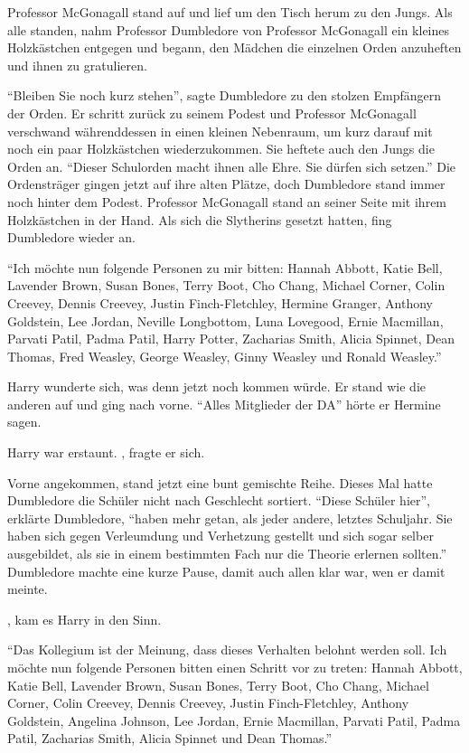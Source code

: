 Professor McGonagall stand auf und lief um den Tisch herum zu den Jungs. Als alle standen, nahm Professor Dumbledore von Professor McGonagall ein kleines Holzkästchen entgegen und begann, den Mädchen die einzelnen Orden anzuheften und ihnen zu gratulieren.

\enquote{Bleiben Sie noch kurz stehen}, sagte Dumbledore zu den stolzen Empfängern der Orden. Er schritt zurück zu seinem Podest und Professor McGonagall verschwand währenddessen in einen kleinen Nebenraum, um kurz darauf mit noch ein paar Holzkästchen wiederzukommen. Sie heftete auch den Jungs die Orden an. \enquote{Dieser Schulorden macht ihnen alle Ehre. Sie dürfen sich setzen.} Die Ordensträger gingen jetzt auf ihre alten Plätze, doch Dumbledore stand immer noch hinter dem Podest. Professor McGonagall stand an seiner Seite mit ihrem Holzkästchen in der Hand. Als sich die Slytherins gesetzt hatten, fing Dumbledore wieder an.

\enquote{Ich möchte nun folgende Personen zu mir bitten: Hannah Abbott, Katie Bell, Lavender Brown, Susan Bones, Terry Boot, Cho Chang, Michael Corner, Colin Creevey, Dennis Creevey, Justin Finch-Fletchley, Hermine Granger, Anthony Goldstein, Lee Jordan, Neville Longbottom, Luna Lovegood, Ernie Macmillan, Parvati Patil, Padma Patil, Harry Potter, Zacharias Smith, Alicia Spinnet, Dean Thomas, Fred Weasley, George Weasley, Ginny Weasley und Ronald Weasley.}

Harry wunderte sich, was denn jetzt noch kommen würde. Er stand wie die anderen auf und ging nach vorne. \enquote{Alles Mitglieder der DA} hörte er Hermine sagen.

Harry war erstaunt. , fragte er sich.

Vorne angekommen, stand jetzt eine bunt gemischte Reihe. Dieses Mal hatte  Dumbledore die Schüler nicht nach Geschlecht sortiert. \enquote{Diese Schüler hier}, erklärte Dumbledore, \enquote{haben mehr getan, als jeder andere, letztes Schuljahr. Sie haben sich gegen Verleumdung und Verhetzung gestellt und sich sogar selber ausgebildet, als sie in einem bestimmten Fach nur die Theorie erlernen sollten.} Dumbledore machte eine kurze Pause, damit auch allen klar war, wen er damit meinte.

, kam es Harry in den Sinn.

\enquote{Das Kollegium ist der Meinung, dass dieses Verhalten belohnt werden soll. Ich möchte nun folgende Personen bitten einen Schritt vor zu treten: Hannah Abbott, Katie Bell, Lavender Brown, Susan Bones, Terry Boot, Cho Chang, Michael Corner, Colin Creevey, Dennis Creevey, Justin Finch-Fletchley, Anthony Goldstein, Angelina Johnson, Lee Jordan, Ernie Macmillan, Parvati Patil, Padma Patil, Zacharias Smith, Alicia Spinnet und Dean Thomas.}

